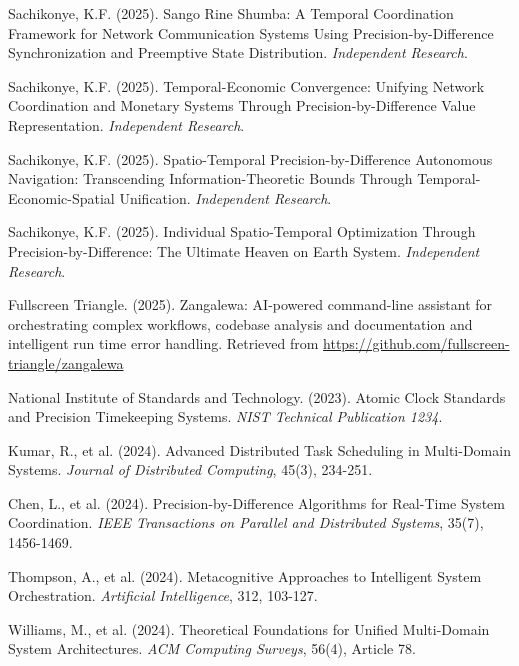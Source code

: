 \documentclass[12pt,a4paper]{article}
\begin{document}

\begin{thebibliography}{99}

Sachikonye, K.F. (2025). Sango Rine Shumba: A Temporal Coordination Framework for Network Communication Systems Using Precision-by-Difference Synchronization and Preemptive State Distribution. \textit{Independent Research}.

Sachikonye, K.F. (2025). Temporal-Economic Convergence: Unifying Network Coordination and Monetary Systems Through Precision-by-Difference Value Representation. \textit{Independent Research}.

Sachikonye, K.F. (2025). Spatio-Temporal Precision-by-Difference Autonomous Navigation: Transcending Information-Theoretic Bounds Through Temporal-Economic-Spatial Unification. \textit{Independent Research}.

Sachikonye, K.F. (2025). Individual Spatio-Temporal Optimization Through Precision-by-Difference: The Ultimate Heaven on Earth System. \textit{Independent Research}.

Fullscreen Triangle. (2025). Zangalewa: AI-powered command-line assistant for orchestrating complex workflows, codebase analysis and documentation and intelligent run time error handling. Retrieved from \url{https://github.com/fullscreen-triangle/zangalewa}

National Institute of Standards and Technology. (2023). Atomic Clock Standards and Precision Timekeeping Systems. \textit{NIST Technical Publication 1234}.

Kumar, R., et al. (2024). Advanced Distributed Task Scheduling in Multi-Domain Systems. \textit{Journal of Distributed Computing}, 45(3), 234-251.

Chen, L., et al. (2024). Precision-by-Difference Algorithms for Real-Time System Coordination. \textit{IEEE Transactions on Parallel and Distributed Systems}, 35(7), 1456-1469.

Thompson, A., et al. (2024). Metacognitive Approaches to Intelligent System Orchestration. \textit{Artificial Intelligence}, 312, 103-127.

Williams, M., et al. (2024). Theoretical Foundations for Unified Multi-Domain System Architectures. \textit{ACM Computing Surveys}, 56(4), Article 78.

\end{thebibliography}
\end{document}
